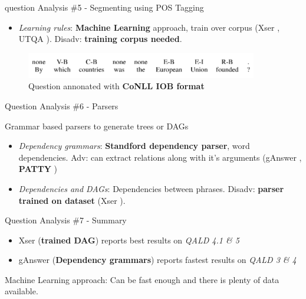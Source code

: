 \documentclass{beamer}
\begin{document}
\begin{frame}{question Analysis \#5 - Segmenting using POS Tagging}
  \begin{card}
    \begin{itemize}
      \item \textit{Learning rules}: \textbf{Machine Learning} approach, train over corpus (Xser \cite{xu2014a}, UTQA \cite{pouran2016a}). Disadv: \textbf{training corpus needed}.
    \end{itemize}
    \begin{figure}\label{fig:conll_tagging}
      \centering
      \includegraphics[width=0.9\textwidth]{./res/conll.png}
      \caption{Question annonated with \textbf{CoNLL IOB format}}
    \end{figure}
  \end{card}
\end{frame}


\begin{frame}{Question Analysis \#6 - Parsers}
  \begin{card}
    Grammar based parsers to generate trees or DAGs
    \begin{itemize}
      \item \textit{Dependency grammars}: \textbf{Standford dependency parser}, word dependencies. Adv: can extract relations along with it's arguments (gAnswer \cite{zou2014a}, \textbf{PATTY} \cite{nakashole2012a})
      \item \textit{Dependencies and DAGs}: Dependencies between phrases. Disadv: \textbf{parser trained on dataset} (Xser \cite{xu2014a}).
    \end{itemize}
  \end{card}
\end{frame}


\begin{frame}{Question Analysis \#7 - Summary}
  \begin{card}
    \begin{itemize}
      \item Xser (\textbf{trained DAG}) reports best results on \textit{QALD 4.1 \& 5}
      \item gAnswer (\textbf{Dependency grammars}) reports fastest results on \textit{QALD 3 \& 4}
    \end{itemize}

    Machine Learning approach: Can be fast enough and there is plenty of data available.
  \end{card}
\end{frame}
\end{document}
